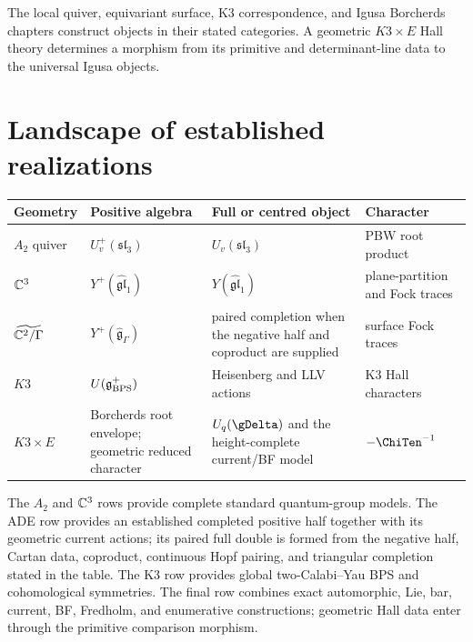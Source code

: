 The local quiver, equivariant surface, K3 correspondence, and Igusa Borcherds chapters construct objects in their stated categories.  A geometric $K3\times E$ Hall theory determines a morphism from its primitive and determinant-line data to the universal Igusa objects.

\chapter{Landscape of established realizations}
\begin{center}
\footnotesize
\begin{tabularx}{0.99\textwidth}{@{}>{\raggedright\arraybackslash}p{}>{\raggedright\arraybackslash}p{}>{\raggedright\arraybackslash}X>{\raggedright\arraybackslash}p{}@{}}
\toprule
\textbf{Geometry}&\textbf{Positive algebra}&\textbf{Full or centred object}&\textbf{Character}\\
\midrule
$A_2$ quiver&$U_v^+(\mathfrak{sl}_3)$&$U_v(\mathfrak{sl}_3)$&PBW root product\\
$\mathbb C^3$&$Y^+(\widehat{\mathfrak{gl}}_1)$&$Y(\widehat{\mathfrak{gl}}_1)$&plane-partition and Fock traces\\
$\widetilde{\mathbb C^2/\Gamma}$&$Y^+(\widehat{\mathfrak g}_\Gamma)$&paired completion when the negative half and coproduct are supplied&surface Fock traces\\
$K3$&$U(\mathfrak g_{\operatorname{BPS}}^+)$&Heisenberg and LLV actions&K3 Hall characters\\
$K3\times E$&Borcherds root envelope; geometric reduced character&$U_q(\gDelta)$ and the height-complete current/BF model&$-\ChiTen^{-1}$\\
\bottomrule
\end{tabularx}
\end{center}
The $A_2$ and $\mathbb C^3$ rows provide complete standard quantum-group models. The ADE row provides an established completed positive half together with its geometric current actions; its paired full double is formed from the negative half, Cartan data, coproduct, continuous Hopf pairing, and triangular completion stated in the table. The K3 row provides global two-Calabi--Yau BPS and cohomological symmetries. The final row combines exact automorphic, Lie, bar, current, BF, Fredholm, and enumerative constructions; geometric Hall data enter through the primitive comparison morphism.

